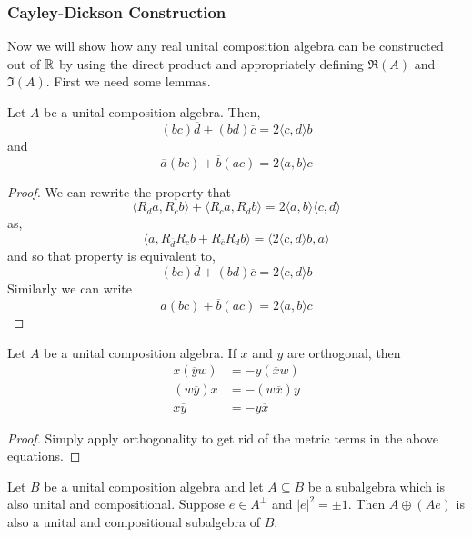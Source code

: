 \subsubsection{Cayley-Dickson Construction}
Now we will show how any real unital composition algebra can be constructed out of $\operatorname{\mathbb{R}}$ by using the direct product and appropriately defining $\Re(A)$ and $\Im(A)$. First we need some lemmas.
\begin{lemma}
    Let $A$ be a unital composition algebra. Then,
    \begin{equation}(bc)\overline{d}+(bd)\overline{c}=2\langle c,d\rangle b\end{equation}
    and
    \begin{equation}\overline{a}(bc)+\overline{b}(ac)=2\langle a,b\rangle c\label{eq:innprod_octonion}\end{equation}
\end{lemma}
\begin{proof}
    We can rewrite the property that
    \[\langle R_d a,R_c b\rangle+\langle R_c a,R_db\rangle = 2\langle a,b\rangle \langle c,d\rangle\]
    as,
    \[\langle a,R_{\overline{d}}R_cb+R_{\overline{c}}R_db\rangle = \langle 2\langle c,d\rangle b,a\rangle\]
    and so that property is equivalent to,
    \[(bc)\overline{d}+(bd)\overline{c}=2\langle c,d\rangle b\]
    Similarly we can write
    \[\overline{a}(bc)+\overline{b}(ac)=2\langle a,b\rangle c\]
\end{proof}
\begin{cor}
Let $A$ be a unital composition algebra. If $x$ and $y$ are orthogonal, then \begin{align*}
x(\overline{y}w) &= -y(\overline{x}w)\\
(w\overline{y})x&=-(w\overline{x})y\\
x\overline{y}&=-y\overline{x}
\end{align*}
\end{cor}
\begin{proof}
    Simply apply orthogonality to get rid of the metric terms in the above equations.
\end{proof}
\begin{lemma}
    Let $B$ be a unital composition algebra and let $A\subseteq B$ be a subalgebra which is also unital and compositional. Suppose $e \in A^\perp$ and $|e|^2=\pm 1$. Then $A\oplus (Ae)$ is also a unital and compositional subalgebra of $B$.
\end{lemma}

